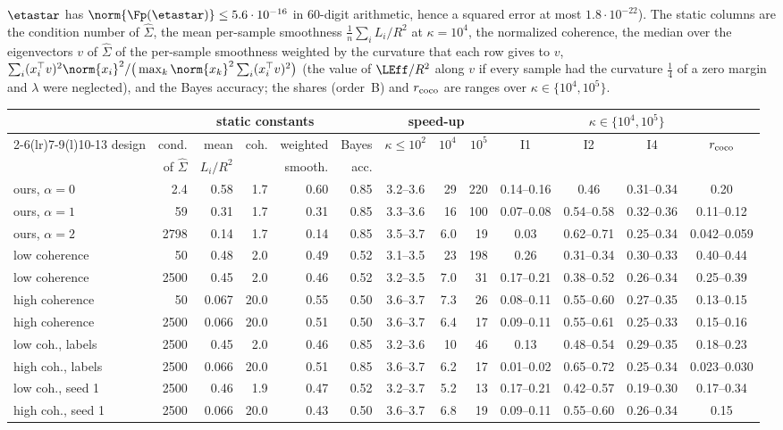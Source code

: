 $\etastar$ has $\norm{\Fp(\etastar)}\le5.6\cdot10^{-16}$ in $60$-digit arithmetic, hence a squared error at most
$1.8\cdot10^{-22}$). The static columns are the condition number of $\hat\Sigma$,
the mean per-sample smoothness $\frac1n\sum_iL_i/R^2$ at $\kappa=10^4$, the normalized coherence, the median over the
eigenvectors $v$ of $\hat\Sigma$ of the per-sample smoothness weighted by the curvature that each row gives to $v$,
$\sum_i(x_i^\top v)^2\norm{x_i}^2/\big(\max_k\norm{x_k}^2\sum_i(x_i^\top v)^2\big)$ (the value of $\LEff/R^2$ along $v$ if
every sample had the curvature $\frac14$ of a zero margin and $\lambda$ were neglected), and the Bayes accuracy; the shares
(order~B) and $r_{\rm coco}$ are ranges over $\kappa\in\{10^4,10^5\}$.
\begin{center}
\footnotesize
\setlength{\tabcolsep}{2.6pt}
\begin{tabular}{@{}lrrrrrcrrcccc@{}}
\toprule
 & \multicolumn{5}{c}{static constants} & \multicolumn{3}{c}{speed-up} & \multicolumn{4}{c}{$\kappa\in\{10^4,10^5\}$} \\
\cmidrule(lr){2-6}\cmidrule(lr){7-9}\cmidrule(l){10-13}
design & cond. & mean & coh. & weighted & Bayes & $\kappa\le10^2$ & $10^4$ & $10^5$ & I1 & I2 & I4 & $r_{\rm coco}$ \\
 & of $\hat\Sigma$ & $L_i/R^2$ & & smooth. & acc. & & & & & & & \\
\midrule
ours, $\alpha=0$ & 2.4 & 0.58 & 1.7 & 0.60 & 0.85 & 3.2--3.6 & 29 & 220 & 0.14--0.16 & 0.46 & 0.31--0.34 & 0.20 \\
ours, $\alpha=1$ & 59 & 0.31 & 1.7 & 0.31 & 0.85 & 3.3--3.6 & 16 & 100 & 0.07--0.08 & 0.54--0.58 & 0.32--0.36 & 0.11--0.12 \\
ours, $\alpha=2$ & 2798 & 0.14 & 1.7 & 0.14 & 0.85 & 3.5--3.7 & 6.0 & 19 & 0.03 & 0.62--0.71 & 0.25--0.34 & 0.042--0.059 \\
low coherence & 50 & 0.48 & 2.0 & 0.49 & 0.52 & 3.1--3.5 & 23 & 198 & 0.26 & 0.31--0.34 & 0.30--0.33 & 0.40--0.44 \\
low coherence & 2500 & 0.45 & 2.0 & 0.46 & 0.52 & 3.2--3.5 & 7.0 & 31 & 0.17--0.21 & 0.38--0.52 & 0.26--0.34 & 0.25--0.39 \\
high coherence & 50 & 0.067 & 20.0 & 0.55 & 0.50 & 3.6--3.7 & 7.3 & 26 & 0.08--0.11 & 0.55--0.60 & 0.27--0.35 & 0.13--0.15 \\
high coherence & 2500 & 0.066 & 20.0 & 0.51 & 0.50 & 3.6--3.7 & 6.4 & 17 & 0.09--0.11 & 0.55--0.61 & 0.25--0.33 & 0.15--0.16 \\
low coh., labels & 2500 & 0.45 & 2.0 & 0.46 & 0.85 & 3.2--3.6 & 10 & 46 & 0.13 & 0.48--0.54 & 0.29--0.35 & 0.18--0.23 \\
high coh., labels & 2500 & 0.066 & 20.0 & 0.51 & 0.85 & 3.6--3.7 & 6.2 & 17 & 0.01--0.02 & 0.65--0.72 & 0.25--0.34 & 0.023--0.030 \\
low coh., seed 1 & 2500 & 0.46 & 1.9 & 0.47 & 0.52 & 3.2--3.7 & 5.2 & 13 & 0.17--0.21 & 0.42--0.57 & 0.19--0.30 & 0.17--0.34 \\
high coh., seed 1 & 2500 & 0.066 & 20.0 & 0.43 & 0.50 & 3.6--3.7 & 6.8 & 19 & 0.09--0.11 & 0.55--0.60 & 0.26--0.34 & 0.15 \\
\bottomrule
\end{tabular}
\end{center}
